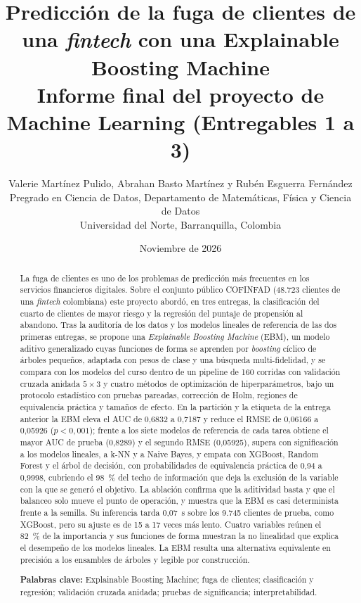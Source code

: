 \documentclass[11pt,a4paper]{article}
\title{\textbf{Predicción de la fuga de clientes de una \emph{fintech} con una Explainable Boosting Machine}\\[6pt]
\large Informe final del proyecto de Machine Learning (Entregables 1 a 3)}
\author{Valerie Martínez Pulido, Abrahan Basto Martínez y Rubén Esguerra Fernández\\[4pt]
\small Pregrado en Ciencia de Datos, Departamento de Matemáticas, Física y Ciencia de Datos\\
\small Universidad del Norte, Barranquilla, Colombia}
\date{Noviembre de 2026}
\begin{document}
\maketitle

\begin{abstract}
\noindent La fuga de clientes es uno de los problemas de predicción más frecuentes en los servicios financieros
digitales. Sobre el conjunto público COFINFAD (48.723 clientes de una \emph{fintech} colombiana) este proyecto
abordó, en tres entregas, la clasificación del cuarto de clientes de mayor riesgo y la regresión del puntaje de
propensión al abandono. Tras la auditoría de los datos y los modelos lineales de referencia de las dos primeras
entregas, se propone una \emph{Explainable Boosting Machine} (EBM), un modelo aditivo generalizado cuyas
funciones de forma se aprenden por \emph{boosting} cíclico de árboles pequeños, adaptada con pesos de clase y
una búsqueda multi-fidelidad, y se compara con los modelos del curso dentro de un pipeline de 160 corridas con
validación cruzada anidada $5 \times 3$ y cuatro métodos de optimización de hiperparámetros, bajo un protocolo
estadístico con pruebas pareadas, corrección de Holm, regiones de equivalencia práctica y tamaños de efecto. En
la partición y la etiqueta de la entrega anterior la EBM eleva el AUC de 0,6832 a 0,7187 y reduce el RMSE de
0,06166 a 0,05926 ($p < 0{,}001$); frente a los siete modelos de referencia de cada tarea obtiene el mayor AUC
de prueba (0,8289) y el segundo RMSE (0,05925), supera con significación a los modelos lineales, a k-NN y a
Naive Bayes, y empata con XGBoost, Random Forest y el árbol de decisión, con probabilidades de equivalencia
práctica de 0,94 a 0,9998, cubriendo el 98~\% del techo de información que deja la exclusión de la variable con
la que se generó el objetivo. La ablación confirma que la aditividad basta y que el balanceo solo mueve el punto
de operación, y muestra que la EBM es casi determinista frente a la semilla. Su inferencia tarda 0,07~s sobre
los 9.745 clientes de prueba, como XGBoost, pero su ajuste es de 15 a 17 veces más lento. Cuatro variables
reúnen el 82~\% de la importancia y sus funciones de forma muestran la no linealidad que explica el desempeño
de los modelos lineales. La EBM resulta una alternativa equivalente en precisión a los ensambles de árboles y
legible por construcción.

\medskip
\noindent\textbf{Palabras clave:} Explainable Boosting Machine; fuga de clientes; clasificación y regresión;
validación cruzada anidada; pruebas de significancia; interpretabilidad.
\end{abstract}

\clearpage
\tableofcontents
\clearpage








\end{document}
